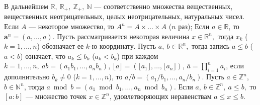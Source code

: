 


В дальнейшем $\mathbb{R},\ 
\mathbb{R}_+,
\ \mathbb{Z}_+,
\ \mathbb{N}$ ---
соответственно множества вещественных, 
вещественных неотрицательных, 
целых неотрицательных, натуральных
чисел.
Если $A$ --- некоторое множество, то $A^n=A\times\ldots \times A$ ($n$ раз);
Если $a\in\mathbb{R}$, то $\mathbf{a}^n=(a,\ldots,a)$.
Пусть рассматривается некоторая величина $x\in\mathbb{R}^n,$ тогда
$x_k$ ($k=1,\ldots,n$) обозначает ее $k$-ю координату. 
Пусть $a,\ b \in \mathbb{R}^n,$ тогда запись $a\leqslant b$ ($a<b$) означает, что 
$a_k\leqslant b_k$ ($a_k<b_k$) при каждом $k=1,\ldots,n,\ ab=(a_1b_1,\ldots,a_n b_n)$,
$\lfloor{a}\rfloor=(\lfloor{a_1}\rfloor,\ldots,\lfloor{a_n}\rfloor)$,
$\overline{a}=\prod_{i=1}^n a_i$, 
если дополнительно $b_k\neq 0$ ($k=1,\ldots, n$), то $a/b=(a_1/b_1,\ldots,a_n/ b_n)$.  
Пусть $a\in \mathbb{Z}^n$, $b\in \mathbb{N}^n$, тогда $a \bmod b =(a_1 \bmod b_1,\ldots,a_n \bmod b_n)$.
Если $a,\ b \in \mathbb{Z}^n,\ a\leqslant b,$ то $[a:b]$ --- множество точек
$x\in \mathbb{Z}^n$, удовлетворяющих неравенствам $a\leqslant x \leqslant b$.



